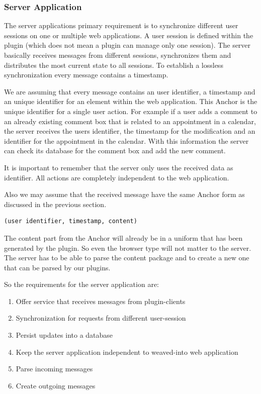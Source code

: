 \subsubsection{Server Application} \label{Social Weaver - Server Application}
The server applications primary requirement is to synchronize different user sessions on one or multiple web applications. A user session is defined within the plugin (which does not mean a plugin can manage only one session). The server basically receives messages from different sessions, synchronizes them and distributes the most current state to all sessions.  To establish a lossless synchronization every message contains a timestamp.

We are assuming that every message contains an user identifier, a timestamp and an unique identifier for an element within the web application. This Anchor is the unique identifier for a single user action. For example if a user adds a comment to an already existing comment box that is related to an appointment in a calendar, the server receives the users identifier, the timestamp for the modification and an identifier for the appointment in the calendar. With this information the server can check its database for the comment box and add the new comment. 

It is important to remember that the server only uses the received data as identifier. All actions are completely independent to the web application. 

Also we may assume that the received message have the same Anchor form as discussed in the previous section. 
\begin{verbatim}(user identifier, timestamp, content)\end{verbatim} 
The content part from the Anchor will already be in a uniform that has been generated by the plugin. So even the browser type will not matter to the server. The server has to be able to parse the content package and to create a new one that can be parsed by our plugins.

So the requirements for the server application are:
\begin{enumerate}
\item Offer service that receives messages from plugin-clients
\item Synchronization for requests from different user-session
\item Persist updates into a database
\item Keep the server application independent to weaved-into web application
\item Parse incoming messages
\item Create outgoing messages
\end{enumerate}


